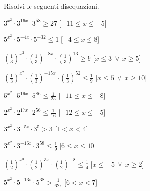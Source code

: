 \begin{esercizio}\label{ese:}
 Risolvi le seguenti disequazioni.
 \begin{enumeratea}
  \item  \(3^{x^2} \cdot 3^{16x} \cdot 3^{58} \geqslant 27\)
   \hfill [\(-11 \leqslant x \leqslant -5\)]
  \item  \(5^{x^2} \cdot 5^{-4x} \cdot 5^{-32} \leqslant 1\)
   \hfill [\(-4 \leqslant x \leqslant 8\)]
  \item  \(\left(\frac{1}{3}\right)^{x^2} \cdot \left(\frac{1}{3}\right)^{-8x} 
\cdot \left(\frac{1}{3}\right)^{13} \geqslant 9\)
   \hfill [\(x \leqslant 3~\vee~x \geqslant 5\)]
  \item  \(\left(\frac{1}{3}\right)^{x^2} \cdot \left(\frac{1}{3}\right)^{-15x} 
\cdot \left(\frac{1}{3}\right)^{52} \leqslant \frac{1}{9}\)
   \hfill [\(x \leqslant 5~\vee~x \geqslant 10\)]
  \item  \(5^{x^2} \cdot 5^{19x} \cdot 5^{86} \leqslant \frac{1}{25}\)
   \hfill [\(-11 \leqslant x \leqslant -8\)]
  \item  \(2^{x^2} \cdot 2^{17x} \cdot 2^{56} \leqslant \frac{1}{16}\)
   \hfill [\(-12 \leqslant x \leqslant -5\)]
  \item  \(3^{x^2} \cdot 3^{-5x} \cdot 3^{5} > 3\)
   \hfill [\(1 < x < 4\)]
  \item  \(3^{x^2} \cdot 3^{-16x} \cdot 3^{58} \leqslant \frac{1}{9}\)
   \hfill [\(6 \leqslant x \leqslant 10\)]
  \item  \(\left(\frac{1}{2}\right)^{x^2} \cdot \left(\frac{1}{2}\right)^{3x} 
\cdot \left(\frac{1}{2}\right)^{-8} \leqslant \frac{1}{4}\)
   \hfill [\(x \leqslant -5~\vee~x \geqslant 2\)]
  \item  \(5^{x^2} \cdot 5^{-13x} \cdot 5^{38} > \frac{1}{625}\)
   \hfill [\(6 < x < 7\)]

\end{enumeratea}
\end{esercizio}

